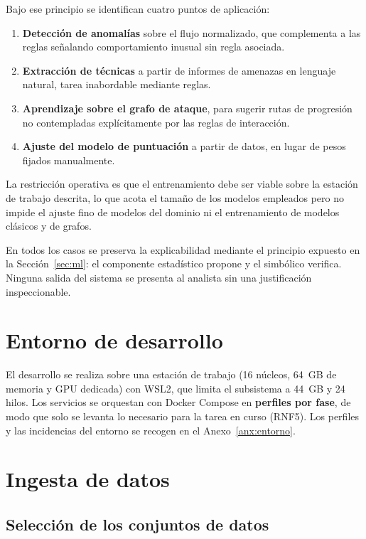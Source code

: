 Bajo ese principio se identifican cuatro puntos de aplicación:

\begin{enumerate}
    \item \textbf{Detección de anomalías} sobre el flujo normalizado, que complementa a las
    reglas señalando comportamiento inusual sin regla asociada.
    \item \textbf{Extracción de técnicas} a partir de informes de amenazas en lenguaje
    natural, tarea inabordable mediante reglas.
    \item \textbf{Aprendizaje sobre el grafo de ataque}, para sugerir rutas de progresión no
    contempladas explícitamente por las reglas de interacción.
    \item \textbf{Ajuste del modelo de puntuación} a partir de datos, en lugar de pesos
    fijados manualmente.
\end{enumerate}

La restricción operativa es que el entrenamiento debe ser viable sobre la estación de
trabajo descrita, lo que acota el tamaño de los modelos empleados pero no impide el ajuste
fino de modelos del dominio ni el entrenamiento de modelos clásicos y de grafos.

En todos los casos se preserva la explicabilidad mediante el principio expuesto en la
Sección~\ref{sec:ml}: el componente estadístico propone y el simbólico verifica. Ninguna
salida del sistema se presenta al analista sin una justificación inspeccionable.

\section{Entorno de desarrollo}

El desarrollo se realiza sobre una estación de trabajo (16 núcleos, 64~GB de memoria y GPU
dedicada) con WSL2, que limita el subsistema a 44~GB y 24 hilos. Los servicios se orquestan con
Docker Compose en \textbf{perfiles por fase}, de modo que solo se levanta lo necesario para la
tarea en curso (RNF5). Los perfiles y las incidencias del entorno se recogen en el
Anexo~\ref{anx:entorno}.

\section{Ingesta de datos}

\subsection{Selección de los conjuntos de datos}

